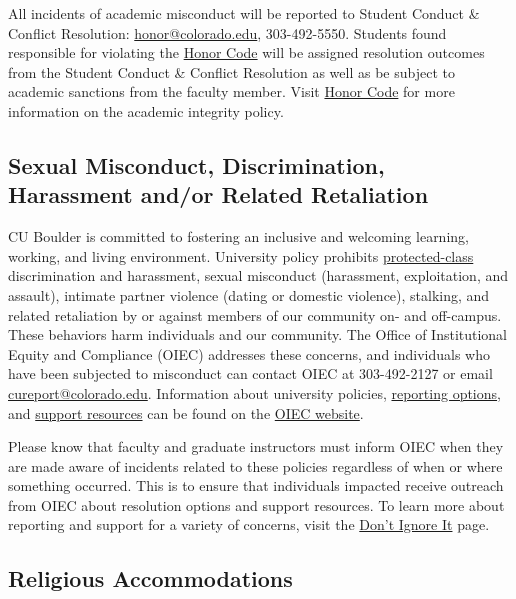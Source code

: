 All incidents of academic misconduct will be reported to Student Conduct
\& Conflict Resolution:
\href{mailto:honor@colorado.edu}{{honor@colorado.edu}}, 303-492-5550.
Students found responsible for violating the
\href{https://www.colorado.edu/sccr/honor-code}{{Honor Code}} will be
assigned resolution outcomes from the Student Conduct \& Conflict
Resolution as well as be subject to academic sanctions from the faculty
member. Visit \href{https://www.colorado.edu/sccr/honor-code}{{Honor
Code}} for more information on the academic integrity policy.

\subsection*{Sexual Misconduct, Discrimination, Harassment and/or Related Retaliation}

CU Boulder is committed to fostering an inclusive and welcoming
learning, working, and living environment. University policy prohibits
\href{https://www.colorado.edu/oiec/policies/discrimination-harassment-policy/protected-class-definitions}{{protected-class}}
discrimination and harassment, sexual misconduct (harassment,
exploitation, and assault), intimate partner violence (dating or
domestic violence), stalking, and related retaliation by or against
members of our community on- and off-campus. These behaviors harm
individuals and our community. The Office of Institutional Equity and
Compliance (OIEC) addresses these concerns, and individuals who have
been subjected to misconduct can contact OIEC at 303-492-2127 or email
\href{mailto:cureport@colorado.edu}{{cureport@colorado.edu}}.
Information about university policies,
\href{https://www.colorado.edu/oiec/reporting-resolutions/making-report}{{reporting
options}}, and
\href{https://www.colorado.edu/oiec/support-resources}{{support
resources}} can be found on the
\href{http://www.colorado.edu/institutionalequity/}{{OIEC website}}.

Please know that faculty and graduate instructors must inform OIEC when
they are made aware of incidents related to these policies regardless of
when or where something occurred. This is to ensure that individuals
impacted receive outreach from OIEC about resolution options and support
resources. To learn more about reporting and support for a variety of
concerns, visit the {\href{https://www.colorado.edu/dontignoreit/}{
Don't Ignore It} page}.

\subsection*{Religious Accommodations}

